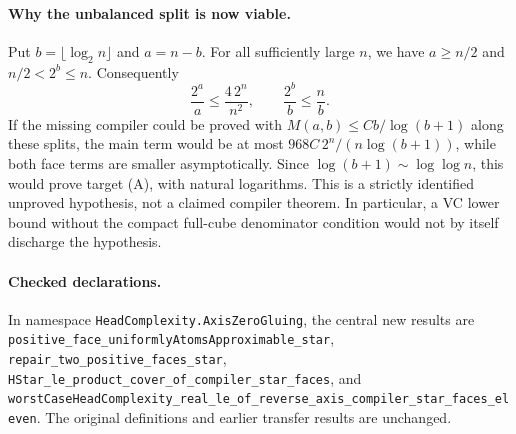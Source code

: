 \documentclass[11pt]{article}
\begin{document}
\paragraph{Why the unbalanced split is now viable.}
Put $b=\lfloor\log_2 n\rfloor$ and $a=n-b$. For all sufficiently large
$n$, we have $a\geq n/2$ and $n/2<2^b\leq n$. Consequently
\[
 \frac{2^a}{a}\leq\frac{4\,2^n}{n^2},\qquad
 \frac{2^b}{b}\leq\frac{n}{b}.
\]
If the missing compiler could be proved with
$M(a,b)\leq Cb/\log(b+1)$ along these splits, the main term would be
at most $968C\,2^n/(n\log(b+1))$, while both face terms are smaller
asymptotically. Since $\log(b+1)\sim\log\log n$, this would prove
target (A), with natural logarithms. This is a strictly identified
unproved hypothesis, not a claimed compiler theorem. In particular,
a VC lower bound without the compact full-cube denominator condition
would not by itself discharge the hypothesis.

\paragraph{Checked declarations.}
In namespace \texttt{HeadComplexity.AxisZeroGluing}, the central new
results are
\texttt{positive\_face\_uniformlyAtomsApproximable\_star},
\texttt{repair\_two\_positive\_faces\_star},
\texttt{HStar\_le\_product\_cover\_of\_compiler\_star\_faces}, and
\texttt{worstCaseHeadComplexity\_real\_le\_of\_reverse\_axis\_compiler\_star\_faces\_eleven}.
The original definitions and earlier transfer results are unchanged.
\end{document}

